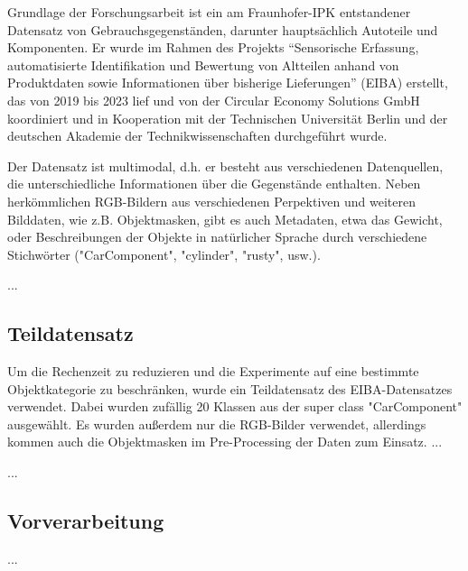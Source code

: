 Grundlage der Forschungsarbeit ist ein am Fraunhofer-IPK entstandener Datensatz von Gebrauchsgegenständen, darunter hauptsächlich Autoteile und Komponenten. Er wurde im Rahmen des Projekts “Sensorische Erfassung, automatisierte Identifikation und Bewertung von Altteilen anhand von Produktdaten sowie Informationen über bisherige Lieferungen” (EIBA) erstellt, das von 2019 bis 2023 lief und von der Circular Economy Solutions GmbH koordiniert und in Kooperation mit der Technischen Universität Berlin und der deutschen Akademie der Technikwissenschaften durchgeführt wurde. \cite{}

Der Datensatz ist multimodal, d.h. er besteht aus verschiedenen Datenquellen, die unterschiedliche Informationen über die Gegenstände enthalten. Neben herkömmlichen RGB-Bildern aus verschiedenen Perpektiven und weiteren Bilddaten, wie z.B. Objektmasken, gibt es auch Metadaten, etwa das Gewicht, oder Beschreibungen der Objekte in natürlicher Sprache durch verschiedene Stichwörter ("CarComponent", "cylinder", "rusty", usw.).


...

\subsection{Teildatensatz}

Um die Rechenzeit zu reduzieren und die Experimente auf eine bestimmte Objektkategorie zu beschränken, wurde ein Teildatensatz des EIBA-Datensatzes verwendet. Dabei wurden zufällig 20 Klassen aus der super class "CarComponent" ausgewählt. Es wurden außerdem nur die RGB-Bilder verwendet, allerdings kommen auch die Objektmasken im Pre-Processing der Daten zum Einsatz. ...


...

\subsection{Vorverarbeitung}


...

